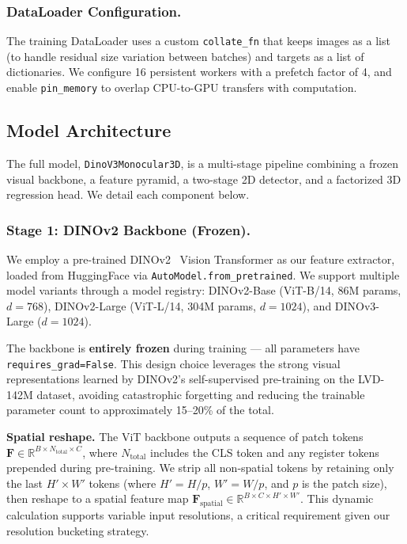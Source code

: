 \documentclass[runningheads]{llncs}
\begin{document}
\subsubsection{DataLoader Configuration.}
The training DataLoader uses a custom \texttt{collate\_fn} that keeps images as a list (to handle residual size variation between batches) and targets as a list of dictionaries.
We configure 16 persistent workers with a prefetch factor of 4, and enable \texttt{pin\_memory} to overlap CPU-to-GPU transfers with computation.


\subsection{Model Architecture}
\label{sec:architecture}

The full model, \texttt{DinoV3Monocular3D}, is a multi-stage pipeline combining a frozen visual backbone, a feature pyramid, a two-stage 2D detector, and a factorized 3D regression head.
We detail each component below.

\subsubsection{Stage 1: DINOv2 Backbone (Frozen).}
\label{sec:backbone}
We employ a pre-trained DINOv2~\cite{oquab2024dinov2} Vision Transformer as our feature extractor, loaded from HuggingFace via \texttt{AutoModel.from\_pretrained}.
We support multiple model variants through a model registry: DINOv2-Base (ViT-B/14, 86M params, $d = 768$), DINOv2-Large (ViT-L/14, 304M params, $d = 1024$), and DINOv3-Large ($d = 1024$).

The backbone is \textbf{entirely frozen} during training --- all parameters have \texttt{requires\_grad=False}.
This design choice leverages the strong visual representations learned by DINOv2's self-supervised pre-training on the LVD-142M dataset, avoiding catastrophic forgetting and reducing the trainable parameter count to approximately 15--20\% of the total.

\noindent\textbf{Spatial reshape.}
The ViT backbone outputs a sequence of patch tokens $\mathbf{F} \in \mathbb{R}^{B \times N_{\text{total}} \times C}$, where $N_{\text{total}}$ includes the CLS token and any register tokens prepended during pre-training.
We strip all non-spatial tokens by retaining only the last $H' \times W'$ tokens (where $H' = H/p$, $W' = W/p$, and $p$ is the patch size), then reshape to a spatial feature map $\mathbf{F}_{\text{spatial}} \in \mathbb{R}^{B \times C \times H' \times W'}$.
This dynamic calculation supports variable input resolutions, a critical requirement given our resolution bucketing strategy.
\end{document}

